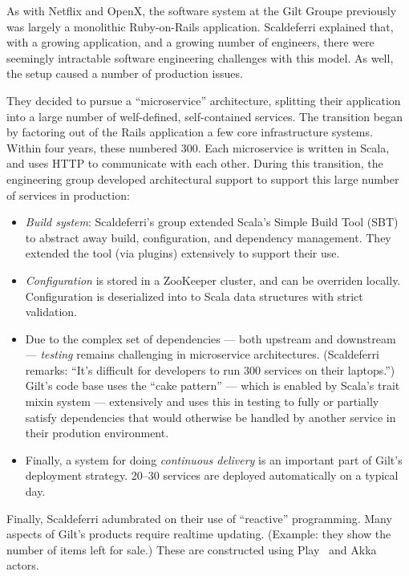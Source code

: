 \documentclass{jfp1}
\begin{document}
As with Netflix and OpenX, the software system at the Gilt Groupe
previously was largely a monolithic Ruby-on-Rails application.
Scaldeferri explained that, with a growing
application, and a growing number of engineers, there were seemingly
intractable software engineering challenges with this model. As well,
the setup caused a number of production issues.

They decided to pursue a ``microservice'' architecture, splitting
their application into a large number of welf-defined, self-contained
services. The transition began by factoring out of the Rails
application a few core infrastructure systems. Within four years,
these numbered 300. Each microservice is written in Scala, and uses
HTTP to communicate with each other. During this transition, the
engineering group developed architectural support to support this
large number of services in production:

\begin{itemize}

\item \textit{Build system}: Scaldeferri's group extended Scala's 
Simple Build Tool (SBT) to abstract away build, configuration, and 
dependency management. They extended the tool (via plugins)
extensively to support their use.

\item \textit{Configuration} is stored in a ZooKeeper cluster, and
can be overriden locally. Configuration is deserialized into to Scala
data structures with strict validation.

\item Due to the complex set of dependencies --- both upstream and
downstream --- \textit{testing} remains challenging in microservice
architectures. (Scaldeferri remarks: ``It's difficult for developers to run 
300 services on their laptops.'') Gilt's code base uses the ``cake pattern'' --- 
which is enabled by Scala's trait mixin system --- extensively and
uses this in testing to fully or partially satisfy dependencies that would
otherwise be handled by another service in their prodution environment.

\item Finally, a system for doing \textit{continuous delivery} is an
important part of Gilt's deployment strategy. 20--30 services are
deployed automatically on a typical day.

\end{itemize}

Finally, Scaldeferri adumbrated on their use of ``reactive''
programming. Many aspects of Gilt's products require realtime
updating. (Example: they show the number of items left for sale.)
These are constructed using Play~\cite{Typesafe:2014:Play} and
Akka~\cite{Typesafe:2014:Akka} actors.
\end{document}
